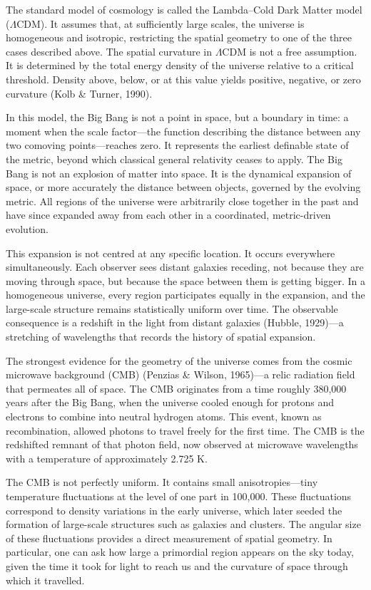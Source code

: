 The standard model of cosmology is called the Lambda–Cold Dark Matter model ($\Lambda$CDM). It assumes that, at sufficiently large scales, the universe is homogeneous and isotropic, restricting the spatial geometry to one of the three cases described above. The spatial curvature in $\Lambda$CDM is not a free assumption. It is determined by the total energy density of the universe relative to a critical threshold. Density above, below, or at this value yields positive, negative, or zero curvature (Kolb \& Turner, 1990).

In this model, the Big Bang is not a point in space, but a boundary in time: a moment when the scale factor—the function describing the distance between any two comoving points—reaches zero. It represents the earliest definable state of the metric, beyond which classical general relativity ceases to apply. The Big Bang is not an explosion of matter into space. It is the dynamical expansion of space, or more accurately the distance between objects, governed by the evolving metric. All regions of the universe were arbitrarily close together in the past and have since expanded away from each other in a coordinated, metric-driven evolution.

This expansion is not centred at any specific location. It occurs everywhere simultaneously. Each observer sees distant galaxies receding, not because they are moving through space, but because the space between them is getting bigger. In a homogeneous universe, every region participates equally in the expansion, and the large-scale structure remains statistically uniform over time. The observable consequence is a redshift in the light from distant galaxies (Hubble, 1929)—a stretching of wavelengths that records the history of spatial expansion.

The strongest evidence for the geometry of the universe comes from the cosmic microwave background (CMB) (Penzias \& Wilson, 1965)—a relic radiation field that permeates all of space. The CMB originates from a time roughly 380,000 years after the Big Bang, when the universe cooled enough for protons and electrons to combine into neutral hydrogen atoms. This event, known as recombination, allowed photons to travel freely for the first time. The CMB is the redshifted remnant of that photon field, now observed at microwave wavelengths with a temperature of approximately 2.725 K.

The CMB is not perfectly uniform. It contains small anisotropies—tiny temperature fluctuations at the level of one part in 100,000. These fluctuations correspond to density variations in the early universe, which later seeded the formation of large-scale structures such as galaxies and clusters. The angular size of these fluctuations provides a direct measurement of spatial geometry. In particular, one can ask how large a primordial region appears on the sky today, given the time it took for light to reach us and the curvature of space through which it travelled.

